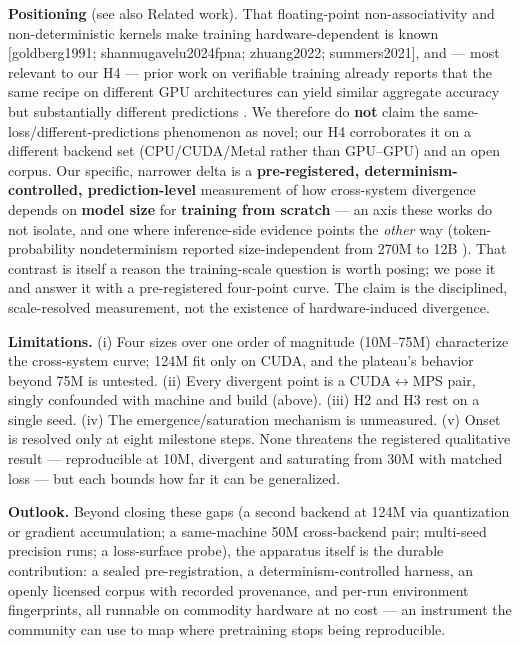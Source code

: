 \documentclass{article}
\begin{document}
\textbf{Positioning} (see also Related work). That floating-point non-associativity and
non-deterministic kernels make training hardware-dependent is known {[}goldberg1991; shanmugavelu2024fpna;
zhuang2022; summers2021{]}, and --- most relevant to our H4 --- prior work on verifiable training
already reports that the same recipe on different GPU architectures can yield similar aggregate
accuracy but substantially different predictions \citep{srivastava2024verifiable}. We therefore do
\textbf{not} claim the same-loss/different-predictions phenomenon as novel; our H4 corroborates it on
a different backend set (CPU/CUDA/Metal rather than GPU--GPU) and an open corpus. Our specific,
narrower delta is a \textbf{pre-registered, determinism-controlled, prediction-level} measurement of
how cross-system divergence depends on \textbf{model size} for \textbf{training from scratch} --- an axis
these works do not isolate, and one where inference-side evidence points the \emph{other} way
(token-probability nondeterminism reported size-independent from 270M to 12B \citep{fu2026beyond}).
That contrast is itself a reason the training-scale question is worth posing; we pose it and
answer it with a pre-registered four-point curve. The claim is the disciplined, scale-resolved
measurement, not the existence of hardware-induced divergence.

\textbf{Limitations.} (i) Four sizes over one order of magnitude (10M--75M) characterize the
cross-system curve; 124M fit only on CUDA, and the plateau's behavior beyond 75M is untested.
(ii) Every divergent point is a CUDA$\leftrightarrow$MPS pair, singly confounded with machine and build (above).
(iii) H2 and H3 rest on a single seed. (iv) The emergence/saturation mechanism is unmeasured.
(v) Onset is resolved only at eight milestone steps. None threatens the registered qualitative
result --- reproducible at 10M, divergent and saturating from 30M with matched loss --- but each
bounds how far it can be generalized.

\textbf{Outlook.} Beyond closing these gaps (a second backend at 124M via quantization or gradient
accumulation; a same-machine 50M cross-backend pair; multi-seed precision runs; a loss-surface
probe), the apparatus itself is the durable contribution: a sealed pre-registration, a
determinism-controlled harness, an openly licensed corpus with recorded provenance, and per-run
environment fingerprints, all runnable on commodity hardware at no cost --- an instrument the
community can use to map where pretraining stops being reproducible.
\end{document}
